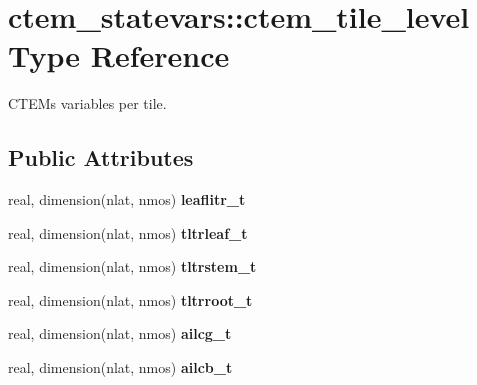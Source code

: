 \hypertarget{structctem__statevars_1_1ctem__tile__level}{}\section{ctem\+\_\+statevars\+:\+:ctem\+\_\+tile\+\_\+level Type Reference}
\label{structctem__statevars_1_1ctem__tile__level}


C\+T\+E\+M\textquotesingle{}s variables per tile.  


\subsection*{Public Attributes}
\begin{DoxyCompactItemize}
\item 
\hypertarget{structctem__statevars_1_1ctem__tile__level_aa0367082d54a249d8bda266e2e397382}{}real, dimension(nlat, nmos) {\bfseries leaflitr\+\_\+t}\label{structctem__statevars_1_1ctem__tile__level_aa0367082d54a249d8bda266e2e397382}

\item 
\hypertarget{structctem__statevars_1_1ctem__tile__level_a36ba5ef599f8511381a73a71c937e883}{}real, dimension(nlat, nmos) {\bfseries tltrleaf\+\_\+t}\label{structctem__statevars_1_1ctem__tile__level_a36ba5ef599f8511381a73a71c937e883}

\item 
\hypertarget{structctem__statevars_1_1ctem__tile__level_aeecb018cd81ba944b362e12f4e58b369}{}real, dimension(nlat, nmos) {\bfseries tltrstem\+\_\+t}\label{structctem__statevars_1_1ctem__tile__level_aeecb018cd81ba944b362e12f4e58b369}

\item 
\hypertarget{structctem__statevars_1_1ctem__tile__level_a31bac1e3d621b89a6c415114f9365307}{}real, dimension(nlat, nmos) {\bfseries tltrroot\+\_\+t}\label{structctem__statevars_1_1ctem__tile__level_a31bac1e3d621b89a6c415114f9365307}

\item 
\hypertarget{structctem__statevars_1_1ctem__tile__level_a1ecef82d89909e61ac3f972271187b1d}{}real, dimension(nlat, nmos) {\bfseries ailcg\+\_\+t}\label{structctem__statevars_1_1ctem__tile__level_a1ecef82d89909e61ac3f972271187b1d}

\item 
\hypertarget{structctem__statevars_1_1ctem__tile__level_a080ee9ee3af75441a8ff3c2033573517}{}real, dimension(nlat, nmos) {\bfseries ailcb\+\_\+t}\label{structctem__statevars_1_1ctem__tile__level_a080ee9ee3af75441a8ff3c2033573517}


\end{DoxyCompactItemize}
